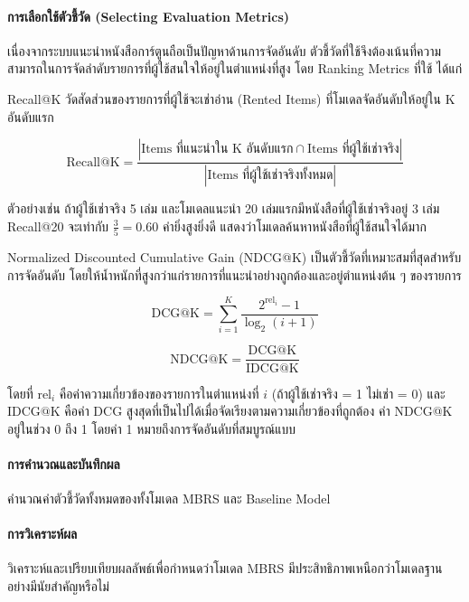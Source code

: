 \paragraph{การเลือกใช้ตัวชี้วัด (Selecting Evaluation Metrics)}
เนื่องจากระบบแนะนำหนังสือการ์ตูนถือเป็นปัญหาด้านการจัดอันดับ ตัวชี้วัดที่ใช้จึงต้องเน้นที่ความสามารถในการจัดลำดับรายการที่ผู้ใช้สนใจให้อยู่ในตำแหน่งที่สูง โดย Ranking Metrics ที่ใช้ ได้แก่

Recall@K วัดสัดส่วนของรายการที่ผู้ใช้จะเช่าอ่าน (Rented Items) ที่โมเดลจัดอันดับให้อยู่ใน K อันดับแรก

\begin{equation}
\text{Recall@K} = \frac{|\text{Items ที่แนะนำใน K อันดับแรก} \cap \text{Items ที่ผู้ใช้เช่าจริง}|}{|\text{Items ที่ผู้ใช้เช่าจริงทั้งหมด}|}
\end{equation}

ตัวอย่างเช่น ถ้าผู้ใช้เช่าจริง 5 เล่ม และโมเดลแนะนำ 20 เล่มแรกมีหนังสือที่ผู้ใช้เช่าจริงอยู่ 3 เล่ม Recall@20 จะเท่ากับ $\frac{3}{5} = 0.60$ ค่ายิ่งสูงยิ่งดี แสดงว่าโมเดลค้นหาหนังสือที่ผู้ใช้สนใจได้มาก

Normalized Discounted Cumulative Gain (NDCG@K) เป็นตัวชี้วัดที่เหมาะสมที่สุดสำหรับการจัดอันดับ โดยให้น้ำหนักที่สูงกว่าแก่รายการที่แนะนำอย่างถูกต้องและอยู่ตำแหน่งต้น ๆ ของรายการ 

\begin{equation}
\text{DCG@K} = \sum_{i=1}^{K} \frac{2^{\text{rel}_i} - 1}{\log_2(i+1)}
\end{equation}

\begin{equation}
\text{NDCG@K} = \frac{\text{DCG@K}}{\text{IDCG@K}}
\end{equation}

โดยที่ $\text{rel}_i$ คือค่าความเกี่ยวข้องของรายการในตำแหน่งที่ $i$ (ถ้าผู้ใช้เช่าจริง = 1 ไม่เช่า = 0) และ $\text{IDCG@K}$ คือค่า DCG สูงสุดที่เป็นไปได้เมื่อจัดเรียงตามความเกี่ยวข้องที่ถูกต้อง ค่า NDCG@K อยู่ในช่วง 0 ถึง 1 โดยค่า 1 หมายถึงการจัดอันดับที่สมบูรณ์แบบ

\paragraph{การคำนวณและบันทึกผล}
คำนวณค่าตัวชี้วัดทั้งหมดของทั้งโมเดล MBRS และ Baseline Model 
\paragraph{การวิเคราะห์ผล}
วิเคราะห์และเปรียบเทียบผลลัพธ์เพื่อกำหนดว่าโมเดล MBRS มีประสิทธิภาพเหนือกว่าโมเดลฐานอย่างมีนัยสำคัญหรือไม่
